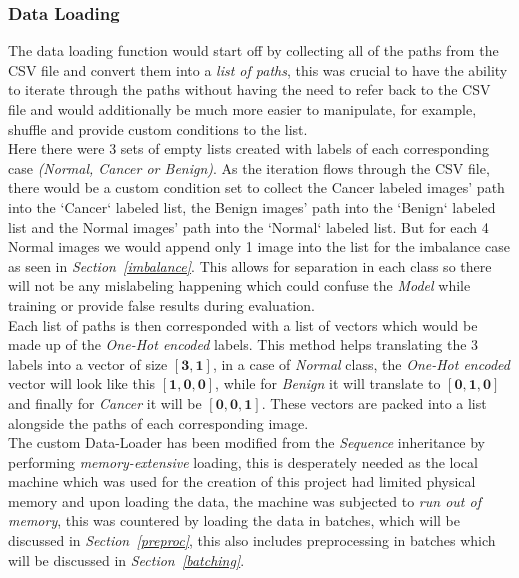 \documentclass[12pt]{extarticle}
\begin{document}
	\subsubsection{Data Loading}\label{data loading}
	The data loading function would start off by collecting all of the paths from the CSV file and convert them into a \emph{list of paths}, this was crucial to have the ability to iterate through the paths without having the need to refer back to the CSV file and would additionally be much more easier to manipulate, for example, shuffle and provide custom conditions to the list.\\
	Here there were 3 sets of empty lists created with labels of each corresponding case \emph{(Normal, Cancer or Benign)}. As the iteration flows through the CSV file, there would be a custom condition set to collect the Cancer labeled images' path into the `Cancer` labeled list, the Benign images' path into the `Benign` labeled list and the Normal images' path into the `Normal` labeled list. But for each 4 Normal images we would append only 1 image into the list for the imbalance case as seen in \emph{Section~\ref{imbalance}}. This allows for separation in each class so there will not be any mislabeling happening which could confuse the \emph{Model} while training or provide false results during evaluation.\\
	Each list of paths is then corresponded with a list of vectors which would be made up of the \emph{One-Hot encoded} labels. This method helps translating the 3 labels into a vector of size $\bm{[3, 1]}$, in a case of \emph{Normal} class, the \emph{One-Hot encoded} vector will look like this $\bm{[1, 0, 0]}$, while for \emph{Benign} it will translate to $\bm{[0, 1, 0]}$ and finally for \emph{Cancer} it will be $\bm{[0, 0, 1]}$. These vectors are packed into a list alongside the paths of each corresponding image.
	\\
	The custom Data-Loader has been modified from the \emph{Sequence} inheritance by performing \emph{memory-extensive} loading, this is desperately needed as the local machine which was used for the creation of this project had limited physical memory and upon loading the data, the machine was subjected to \emph{run out of memory}, this was countered by loading the data in batches, which will be discussed in \emph{Section~\ref{preproc}}, this also includes preprocessing in batches which will be discussed in \emph{Section~\ref{batching}}.
\end{document}
